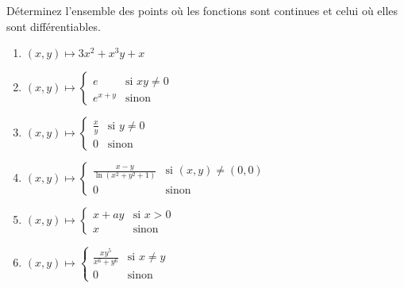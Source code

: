 
\begin{exercice}\label{exo0042}

Déterminez l'ensemble des points où les fonctions sont continues et celui où elles sont différentiables.
\begin{multicols}{2}
\begin{enumerate}
\item
$(x,y) \mapsto 3x^2 +x^3y + x $

\item
 $(x,y) \mapsto \left\{ \begin{array}{ll} e & \mbox{si }xy \not= 0 \\ e^{x+y} & \mbox{sinon} \end{array} \right. $

\item
 $(x,y) \mapsto \left\{ \begin{array}{ll} \frac{x}{y} & \mbox{si } y \not= 0 \\ 0 & \mbox{sinon} \end{array} \right. $

\item
 $(x,y) \mapsto \left\{ \begin{array}{ll} \frac{x-y}{\ln(x^2+y^2+1)} & \mbox{si }(x,y) \not= (0,0) \\ 0 & \mbox{sinon} \end{array} \right.$

\item
 $(x,y) \mapsto \left\{ \begin{array}{ll} x+ay & \mbox{si } x >0 \\ x & \mbox{sinon} \end{array} \right.$

\item
 $(x,y) \mapsto \left\{ \begin{array}{ll} \frac{xy^5}{x^6+y^6} & \mbox{si } x \not= y \\ 0 & \mbox{sinon} \end{array} \right.$
\end{enumerate}
\end{multicols}

\end{exercice}
